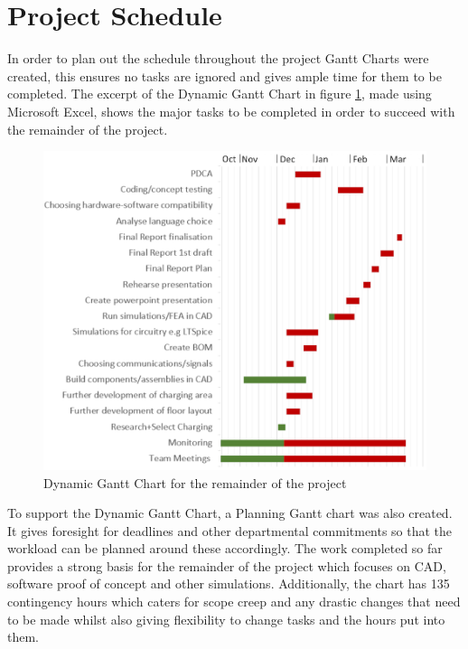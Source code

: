 \documentclass[12pt,titlepage]{article}
\begin{document}
 \FloatBarrier
 
\section{Project Schedule}

In order to plan out the schedule throughout the project Gantt Charts were created, this ensures no tasks are ignored and gives ample time for them to be completed. The excerpt of the Dynamic Gantt Chart in  figure \ref{fig:x}, made using Microsoft Excel, shows the major tasks to be completed in order to succeed with the remainder of the project. 

\begin{figure}[H]
    \centering
        \includegraphics[width=0.95\linewidth]{GANTT EDITED BY LOUIS.png} %
        \caption{Dynamic Gantt Chart for the remainder of the project}
        \label{fig:x}

\end{figure}
\vspace{-20pt}
To support the Dynamic Gantt Chart, a Planning Gantt chart was also created. It gives foresight for deadlines and other departmental commitments so that the workload can be planned around these accordingly. The work completed so far provides a strong basis for the remainder of the project which focuses on CAD, software proof of concept and other simulations. Additionally, the  chart has 135 contingency hours which caters for scope creep and any drastic changes that need to be made whilst also giving flexibility to change tasks and the hours put into them. 
\FloatBarrier
\end{document}
